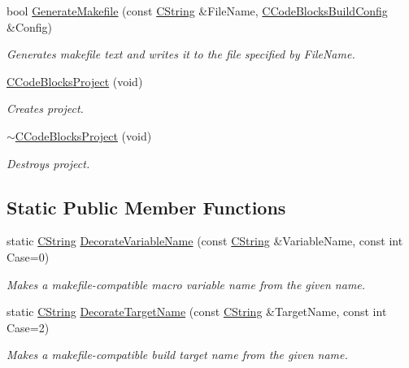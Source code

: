 \begin{DoxyCompactItemize}
\item 
bool \hyperlink{classCCodeBlocksProject_aa2b01dbf48f2a193a0bc426bc50ce77b}{Generate\-Makefile} (const \hyperlink{classCString}{C\-String} \&File\-Name, \hyperlink{classCCodeBlocksBuildConfig}{C\-Code\-Blocks\-Build\-Config} \&Config)
\begin{DoxyCompactList}\small\item\em Generates makefile text and writes it to the file specified by {\itshape File\-Name}. \end{DoxyCompactList}\item 
\hyperlink{classCCodeBlocksProject_acf5f2c8a4d1d363de6fe514df5a426bf}{C\-Code\-Blocks\-Project} (void)
\begin{DoxyCompactList}\small\item\em Creates project. \end{DoxyCompactList}\item 
\hyperlink{classCCodeBlocksProject_a937f0e40e914faee4f0d327d17de8f29}{$\sim$\-C\-Code\-Blocks\-Project} (void)
\begin{DoxyCompactList}\small\item\em Destroys project. \end{DoxyCompactList}\end{DoxyCompactItemize}
\subsection*{Static Public Member Functions}
\begin{DoxyCompactItemize}
\item 
static \hyperlink{classCString}{C\-String} \hyperlink{classCCodeBlocksProject_a356c8c5bdee3f2e32a779f6f13883921}{Decorate\-Variable\-Name} (const \hyperlink{classCString}{C\-String} \&Variable\-Name, const int Case=0)
\begin{DoxyCompactList}\small\item\em Makes a makefile-\/compatible macro variable name from the given name. \end{DoxyCompactList}\item 
static \hyperlink{classCString}{C\-String} \hyperlink{classCCodeBlocksProject_a92c3e6ad2c255b0760d3e2e906d044d8}{Decorate\-Target\-Name} (const \hyperlink{classCString}{C\-String} \&Target\-Name, const int Case=2)
\begin{DoxyCompactList}\small\item\em Makes a makefile-\/compatible build target name from the given name. \end{DoxyCompactList}\end{DoxyCompactItemize}
